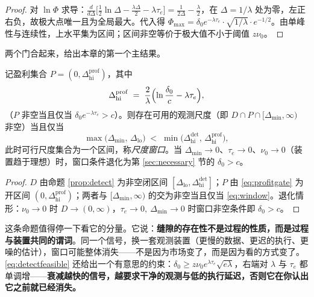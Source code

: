 \begin{proof}
对 $\ln\Phi$ 求导：$\frac{d}{d\Delta}\bigl[\tfrac12\ln\Delta-\tfrac{\lambda\Delta}{2}-\lambda\tau_e\bigr]=\frac{1}{2\Delta}-\frac{\lambda}{2}$，在 $\Delta=1/\lambda$ 处为零，左正右负，故极大点唯一且为全局最大。代入得 $\Phi_{\max}=\delta_0 e^{-\lambda\tau_e}\cdot\sqrt{1/\lambda}\cdot e^{-1/2}$。由单峰性与连续性，上水平集为区间；区间非空等价于极大值不小于阈值 $z\nu_0$。
\end{proof}

两个门合起来，给出本章的第一个主结果。

\begin{proposition}[尺度窗口]\label{prop:window}
记盈利集合 $P=(0,\Delta_{\mathrm{hi}}^{\mathrm{prof}})$，其中
\begin{equation}
  \Delta_{\mathrm{hi}}^{\mathrm{prof}} \;=\; \frac{2}{\lambda}\Bigl(\ln\frac{\delta_0}{c}-\lambda\tau_e\Bigr),
\end{equation}
（$P$ 非空当且仅当 $\delta_0 e^{-\lambda\tau_e}>c$）。则存在可用的观测尺度（即 $D\cap P\cap[\Delta_{\min},\infty)$ 非空）当且仅当
\begin{equation}
  \max\bigl(\Delta_{\min},\,\Delta_{\mathrm{lo}}\bigr) \;<\; \min\bigl(\Delta_{\mathrm{hi}}^{\mathrm{det}},\,\Delta_{\mathrm{hi}}^{\mathrm{prof}}\bigr),
  \label{eq:window}
\end{equation}
此时可行尺度集合为一个区间，称\emph{尺度窗口}。当 $\Delta_{\min}\to 0$、$\tau_e\to 0$、$\nu_0\to 0$（装置趋于理想）时，窗口条件退化为第 \ref{sec:necessary} 节的 $\delta_0>c$。
\end{proposition}

\begin{proof}
$D$ 由命题 \ref{prop:detect} 为非空闭区间 $[\Delta_{\mathrm{lo}},\Delta_{\mathrm{hi}}^{\mathrm{det}}]$；$P$ 由 \eqref{eq:profitgate} 为开区间 $(0,\Delta_{\mathrm{hi}}^{\mathrm{prof}})$；两者与 $[\Delta_{\min},\infty)$ 的交为非空当且仅当 \eqref{eq:window}。退化情形：$\nu_0\to 0$ 时 $D\to(0,\infty)$，$\tau_e\to0,\ \Delta_{\min}\to0$ 时窗口非空条件即 $\delta_0>c$。
\end{proof}

这条命题值得停一下看它的分量。它说：\textbf{缝隙的存在性不是过程的性质，而是过程与装置共同的谓词}。同一个信号，换一套观测装置（更慢的数据、更迟的执行、更噪的估计），窗口可能整体消失——不是因为市场变了，而是因为看的方式变了。\eqref{eq:detectfeasible} 还给出一个有意思的约束：$\delta_0\ge z\nu_0 e^{\lambda\tau_e}\sqrt{e\lambda}$，右端对 $\lambda$ 与 $\tau_e$ 都单调增——\textbf{衰减越快的信号，越要求干净的观测与低的执行延迟，否则它在你认出它之前就已经消失。}

